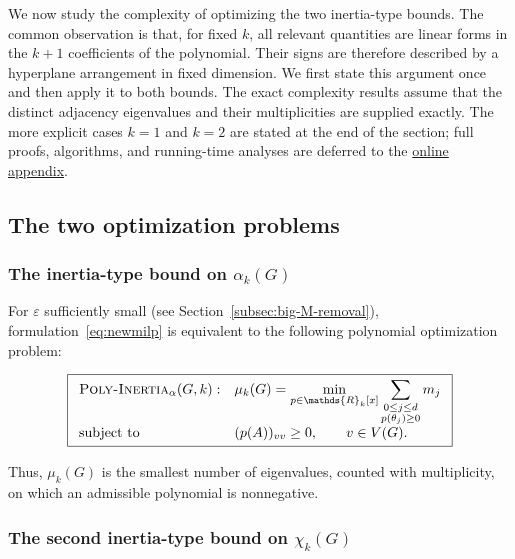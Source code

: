 \documentclass[10pt]{article}
\newcommand{\RR}{\mathds{R}}
\begin{document}
We now study the complexity of optimizing the two
inertia-type bounds. The common observation is that, for fixed \(k\), all
relevant quantities are linear forms in the \(k+1\) coefficients of the
polynomial. Their signs are therefore described by a hyperplane arrangement
in fixed dimension. We first state this argument once and then apply it to
both bounds. The exact complexity results assume that the distinct adjacency
eigenvalues and their multiplicities are supplied exactly. The more explicit
cases \(k=1\) and \(k=2\) are stated at the end of the section; full proofs,
algorithms, and running-time analyses are deferred to the \href{https://github.com/Valentin-Michaux/Optimization-of-inertia-type-bounds-on-the-independence-and-chromatic-numbers-of-graph-powers/blob/main/Online%20Appendix.pdf}
{online appendix}.

\subsection{The two optimization problems}

\subsubsection{The inertia-type bound on \(\alpha_k(G)\)}
\label{sec:complexity}
\label{subsec:alpha-problem-preprocessing}

For \(\varepsilon\) sufficiently small (see Section~\ref{subsec:big-M-removal}),
formulation~\eqref{eq:newmilp} is equivalent to the
following polynomial optimization problem:

\begin{equation}
\label{eq:poly-inertia-alpha-problem}
\boxed{
\begin{array}{ll}
\textsc{Poly-Inertia}_{\alpha}(G,k):
&
\displaystyle
\mu_k(G)=
\min_{p\in\RR_k[x]}
\sum_{\substack{0\leq j\leq d\\p(\theta_j)\geq0}}m_j
\\
\text{subject to}
&
\displaystyle
(p(A))_{vv}\geq0,
\qquad v\in V(G).
\end{array}
}
\end{equation}

Thus, \(\mu_k(G)\) is the smallest number of eigenvalues,
counted with multiplicity, on which an admissible polynomial is
nonnegative.

\subsubsection{The second inertia-type bound on \(\chi_k(G)\)}
\label{sec:complexity-second-inertial}
\label{subsec:chi-problem-formulation}
\end{document}
